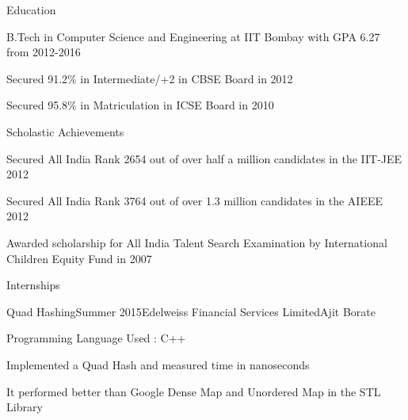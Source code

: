 \documentclass{resume} %
\begin{document}

\begin{rSection}{Education}
\begin{rSubsection}{}{}{}{}
\item B.Tech in Computer Science and Engineering at IIT Bombay with GPA 6.27 from 2012-2016
\item Secured 91.2\% in Intermediate/+2 in CBSE Board in 2012
\item Secured 95.8\% in Matriculation in ICSE Board in 2010 
\end{rSubsection}
\end{rSection}



\begin{rSection}{Scholastic Achievements}
\begin{rSubsection}{}{}{}{}
\item Secured All India Rank 2654 out of over half a million candidates in the IIT-JEE 2012
\item Secured All India Rank 3764 out of over 1.3 million candidates in the AIEEE 2012
\item Awarded scholarship for All India Talent Search Examination by International Children Equity Fund in 2007
\end{rSubsection}
\end{rSection}


\begin{rSection}{Internships}
\begin{rSubsection}{Quad Hashing}{Summer 2015}{Edelweiss Financial Services Limited}{Ajit Borate}
\item Programming Language Used : C++
\item Implemented a Quad Hash and measured time in nanoseconds
\item It performed better than Google Dense Map and Unordered Map in the STL Library
\end{rSubsection}
\end{rSection}
\end{document}
